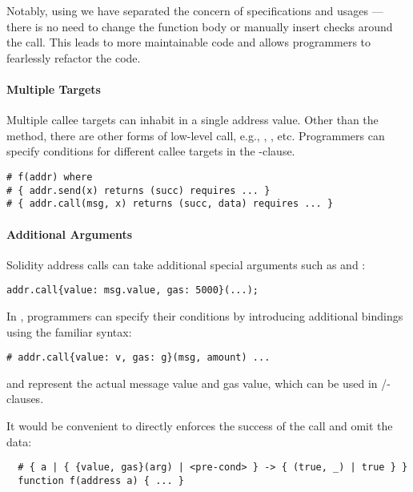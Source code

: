 Notably, using \lang we have separated the concern of specifications and usages
--- there is no need to change the function body or manually insert checks
around the call. This leads to more maintainable code and allows programmers to
fearlessly refactor the code.

\paragraph{Multiple Targets}
Multiple callee targets can inhabit in a single address value.
Other than the  method, there are other forms of low-level call,
e.g., , , etc.
Programmers can specify conditions for different callee targets in the
-clause.
\begin{lstlisting}
# f(addr) where
# { addr.send(x) returns (succ) requires ... }
# { addr.call(msg, x) returns (succ, data) requires ... }
\end{lstlisting}


\paragraph{Additional Arguments}
Solidity address calls can take additional special arguments
such as  and :
\begin{lstlisting}
addr.call{value: msg.value, gas: 5000}(...);
\end{lstlisting}
In \lang, programmers can specify their conditions by introducing additional
bindings using the familiar syntax:
\begin{lstlisting}
# addr.call{value: v, gas: g}(msg, amount) ...
\end{lstlisting}
 and  represent the actual message value and gas
value, which can be used in /-clauses.

\iffalse
It would be convenient to directly enforces the success of the call and omit
the data:
\begin{lstlisting}
  # { a | { {value, gas}(arg) | <pre-cond> } -> { (true, _) | true } }
  function f(address a) { ... }
\end{lstlisting}

